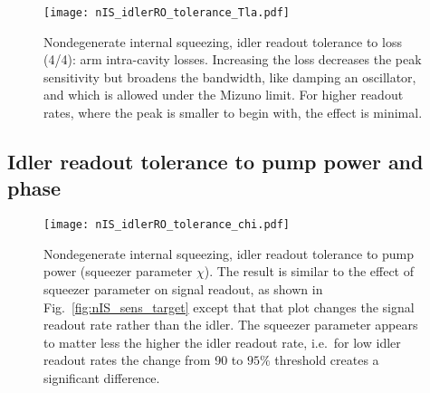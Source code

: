 \begin{figure}
    \centering
    \texttt{[image: nIS\_idlerRO\_tolerance\_Tla.pdf]} 
    \caption{ Nondegenerate internal squeezing, idler readout tolerance to loss (4/4): arm intra-cavity losses. Increasing the loss decreases the peak sensitivity but broadens the bandwidth, like damping an oscillator, and which is allowed under the Mizuno limit. For higher readout rates, where the peak is smaller to begin with, the effect is minimal.}
    \label{fig:}
\end{figure}


\subsection{Idler readout tolerance to pump power and phase}


\begin{figure}
	\centering
	\texttt{[image: nIS\_idlerRO\_tolerance\_chi.pdf]} %
	\caption{ Nondegenerate internal squeezing, idler readout tolerance to pump power (squeezer parameter $\chi$). The result is similar to the effect of squeezer parameter on signal readout, as shown in Fig.~\ref{fig:nIS_sens_target} except that that plot changes the signal readout rate rather than the idler. The squeezer parameter appears to matter less the higher the idler readout rate, i.e.\ for low idler readout rates the change from 90 to $95\%$ threshold creates a significant  difference. }
	\label{fig:}
\end{figure}


